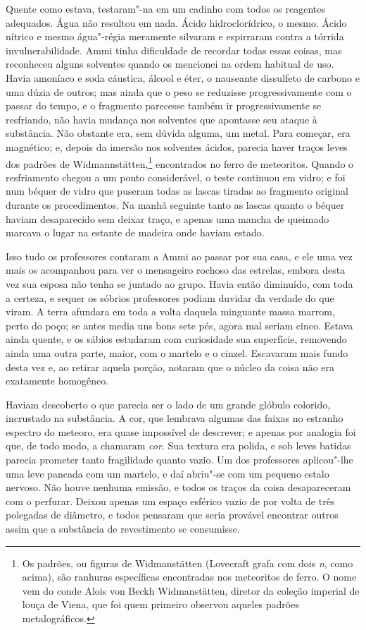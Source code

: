 Quente como estava, testaram"-na em um cadinho com todos os reagentes
adequados. Água não resultou em nada. Ácido hidroclorídrico, o mesmo.
Ácido nítrico e mesmo água"-régia meramente silvaram e espirraram contra
a tórrida invulnerabilidade. Ammi tinha dificuldade de recordar todas
essas coisas, mas reconheceu alguns solventes quando os mencionei na
ordem habitual de uso. Havia amoníaco e soda cáustica, álcool e éter, o
nauseante dissulfeto de carbono e uma dúzia de outros; mas ainda que o
peso se reduzisse progressivamente com o passar do tempo, e o fragmento
parecesse também ir progressivamente se resfriando, não havia mudança
nos solventes que apontasse seu ataque à substância. Não obstante era,
sem dúvida alguma, um metal. Para começar, era magnético; e, depois da
imersão nos solventes ácidos, parecia haver traços leves dos padrões de
Widmannstätten,\footnote{Os padrões, ou figuras de Widmanstätten
  (Lovecraft grafa com dois \textit{n}, como acima), são ranhuras específicas
  encontradas nos meteoritos de ferro. O nome vem do conde Alois von
  Beckh Widmanstätten, diretor da coleção imperial de louça de Viena,
  que foi quem primeiro observou aqueles padrões metalográficos.}
encontrados no ferro de meteoritos. Quando o resfriamento chegou a um
ponto considerável, o teste continuou em vidro; e foi num béquer de
vidro que puseram todas as lascas tiradas ao fragmento original durante
os procedimentos. Na manhã seguinte tanto as lascas quanto o béquer
haviam desaparecido sem deixar traço, e apenas uma mancha de queimado
marcava o lugar na estante de madeira onde haviam estado.

Isso tudo os professores contaram a Ammi ao passar por sua casa, e ele
uma vez mais os acompanhou para ver o mensageiro rochoso das estrelas,
embora desta vez sua esposa não tenha se juntado ao grupo. Havia então
diminuído, com toda a certeza, e sequer os sóbrios professores podiam
duvidar da verdade do que viram. A terra afundara em toda a volta
daquela minguante massa marrom, perto do poço; se antes media uns bons
sete pés, agora mal seriam cinco. Estava ainda quente, e os sábios
estudaram com curiosidade sua superfície, removendo ainda uma outra
parte, maior, com o martelo e o cinzel. Escavaram mais fundo desta vez
e, ao retirar aquela porção, notaram que o núcleo da coisa não era
exatamente homogêneo.

Haviam descoberto o que parecia ser o lado de um grande glóbulo
colorido, incrustado na substância. A cor, que lembrava algumas das
faixas no estranho espectro do meteoro, era quase impossível de
descrever; e apenas por analogia foi que, de todo modo, a chamaram
\textit{cor}. Sua textura era polida, e sob leves batidas parecia prometer
tanto fragilidade quanto vazio. Um dos professores aplicou"-lhe uma leve
pancada com um martelo, e daí abriu"-se com um pequeno estalo nervoso.
Não houve nenhuma emissão, e todos os traços da coisa desapareceram com
o perfurar. Deixou apenas um espaço esférico vazio de por volta de três
polegadas de diâmetro, e todos pensaram que seria provável encontrar
outros assim que a substância de revestimento se consumisse.

